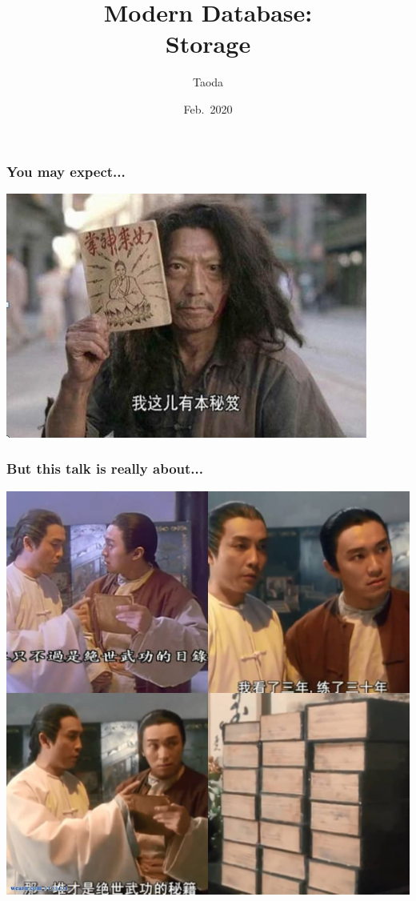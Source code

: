 \documentclass[lualatex]{beamer}
\title[Modern DB: Storage]{Modern Database:\\\normalsize Storage}
\author{Taoda}
\institute{YITU tech}
\date{Feb.\ 2020}
\begin{document}
\begin{frame}
\titlepage
\end{frame}

\begin{frame}
  \frametitle{You may expect...}
  \begin{center}
    \includegraphics[width=\textwidth]{../figs/secret_kungfu.jpg}
  \end{center}
\end{frame}

\begin{frame}
  \frametitle{But this talk is really about...}
  \begin{center}
    \includegraphics[height=0.8\textheight]{../figs/kungfu_category.jpg}
  \end{center}
\end{frame}
\end{document}
